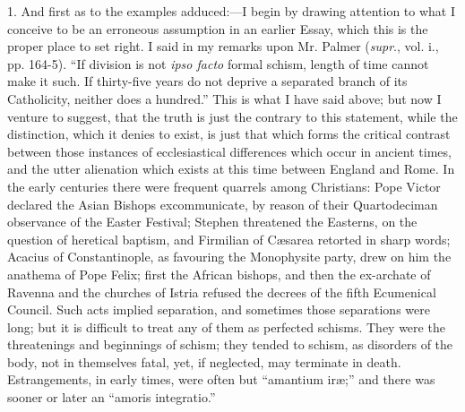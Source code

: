 1. And first as to the examples adduced:—I begin by drawing
attention to what I conceive to be an erroneous assumption in an
earlier Essay, which this is the proper place to set right. I said in
my remarks upon Mr. Palmer (\emph{supr}., vol. i., pp. 164-5).
``If division is not \emph{ipso facto} formal schism, length of
time cannot make it such. If thirty-five years do not deprive a
separated branch of its Catholicity, neither does a hundred.''
This is what I have said above; but now I venture to suggest, that the
truth is just the contrary to this statement, while the distinction,
which it denies to exist, is just that which forms the critical
contrast between those instances of ecclesiastical differences which
occur in ancient times, and the utter alienation which exists at this
time between England and Rome. In the early centuries there were
frequent quarrels among Christians: Pope Victor declared the Asian
Bishops excommunicate, by reason of their Quartodeciman observance of
the Easter Festival; Stephen threatened the Easterns, on the question
of heretical baptism, and Firmilian of Cæsarea retorted in sharp
words; Acacius of Constantinople, as favouring the Monophysite party,
drew on him the anathema of Pope Felix; first the African bishops, and
then the ex-archate of Ravenna and the churches of Istria refused the
decrees of the fifth Ecumenical Council. Such acts implied separation,
and sometimes those separations were long; but it is difficult to
treat any of them as perfected schisms. They were the threatenings and
beginnings of schism; they tended to schism, as disorders of the body,
not in themselves fatal, yet, if neglected, may terminate in death.
Estrangements, in early times, were often but ``amantium iræ;''
and there was sooner or later an ``amoris integratio.''

